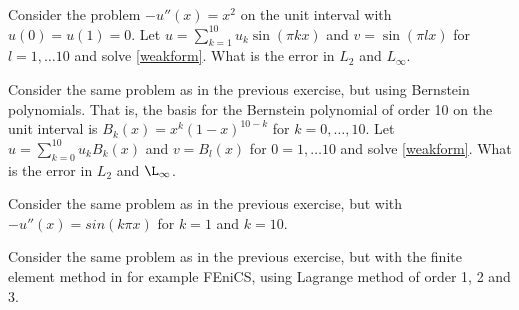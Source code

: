 \begin{exercise}
Consider the problem $-u''(x) = x^2$ on the unit interval with $u(0) = u(1) = 0$.  
Let $u=\sum_{k=1}^{10} u_k \sin(\pi k x )$ and $v=\sin(\pi l x)$ for $l=1, \ldots 10$
and solve \eqref{weakform}. What is the error in $L_2$ and $L_\infty$.  
\end{exercise}

\begin{exercise}
Consider the same problem as in the previous exercise, but using Bernstein polynomials. 
That is, the basis for the Bernstein polynomial of order 10 on the unit interval is $B_k(x)=x^k(1-x)^{10-k}$ for $k=0, \ldots, 10$.  
Let $u=\sum_{k=0}^{10} u_k B_k(x )$ and $v=B_l(x)$ for $0=1, \ldots 10$
and solve \eqref{weakform}. What is the error in $L_2$ and $\L_\infty$.  
\end{exercise}

\begin{exercise}
Consider the same problem as in the previous exercise, but with  
$-u''(x) = sin(k \pi x)$ for $k=1$ and $k=10$.  
\end{exercise}

\begin{exercise}
Consider the same problem as in the previous exercise, but
with the finite element method in for example FEniCS, using Lagrange 
method of order 1, 2 and 3. 

\end{exercise}











